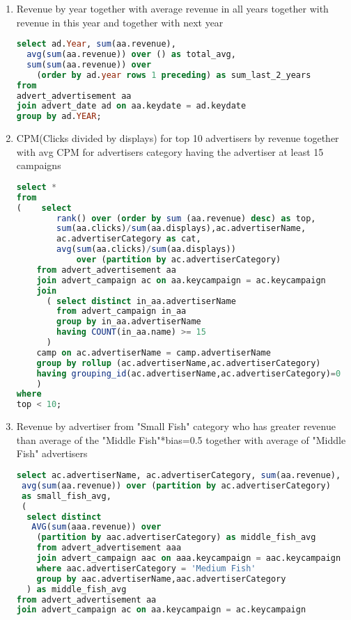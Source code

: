 \begin{enumerate}
\item    Revenue by year together with average revenue in all years together with revenue in this year and together with next year
\begin{lstlisting}[language=sql] 
select ad.Year, sum(aa.revenue), 
  avg(sum(aa.revenue)) over () as total_avg,
  sum(sum(aa.revenue)) over 
    (order by ad.year rows 1 preceding) as sum_last_2_years
from   
advert_advertisement aa
join advert_date ad on aa.keydate = ad.keydate
group by ad.YEAR;
  \end{lstlisting}
\item    CPM(Clicks divided by displays) for top 10 advertisers by revenue together with avg CPM for advertisers category having the advertiser at least 15 campaigns
  \begin{lstlisting}[language=sql] 
select *
from 
(    select
        rank() over (order by sum (aa.revenue) desc) as top,
        sum(aa.clicks)/sum(aa.displays),ac.advertiserName,
        ac.advertiserCategory as cat, 
        avg(sum(aa.clicks)/sum(aa.displays)) 
            over (partition by ac.advertiserCategory)
    from advert_advertisement aa
    join advert_campaign ac on aa.keycampaign = ac.keycampaign
    join
      ( select distinct in_aa.advertiserName 
        from advert_campaign in_aa
        group by in_aa.advertiserName
        having COUNT(in_aa.name) >= 15
      )
    camp on ac.advertiserName = camp.advertiserName
    group by rollup (ac.advertiserName,ac.advertiserCategory) 
    having grouping_id(ac.advertiserName,ac.advertiserCategory)=0
    )
where 
top < 10;
\end{lstlisting}
\item Revenue by advertiser from "Small Fish" category who has greater revenue than average of the "Middle Fish"*bias=0.5 together with average of "Middle Fish" advertisers  
  \begin{lstlisting}[language=sql] 
select ac.advertiserName, ac.advertiserCategory, sum(aa.revenue), 
 avg(sum(aa.revenue)) over (partition by ac.advertiserCategory) 
 as small_fish_avg,
 ( 
  select distinct
   AVG(sum(aaa.revenue)) over 
    (partition by aac.advertiserCategory) as middle_fish_avg
    from advert_advertisement aaa 
    join advert_campaign aac on aaa.keycampaign = aac.keycampaign
    where aac.advertiserCategory = 'Medium Fish'   
    group by aac.advertiserName,aac.advertiserCategory
  ) as middle_fish_avg
from advert_advertisement aa
join advert_campaign ac on aa.keycampaign = ac.keycampaign

\end{lstlisting}
\end{enumerate}
